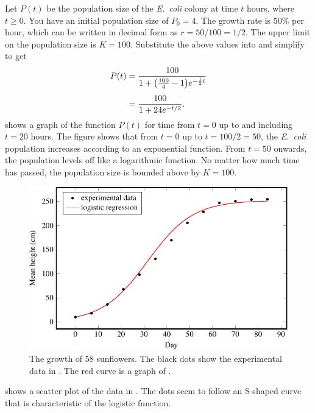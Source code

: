 \documentclass[a4paper,oneside,12pt]{article}
\begin{document}
\begin{problem}
{\begin{solution}
Let $P(t)$ be the population size of the \emph{E.~coli} colony at time
$t$ hours, where $t \geq 0$.  You have an initial population size of
$P_0 = 4$.  The growth rate is $50\%$ per hour, which can be written
in decimal form as $r = 50 / 100 = 1 / 2$.  The upper limit on the
population size is $K = 100$.  Substitute the above values into
 and simplify to get
\begin{align*}
P(t)
&=
\frac{
  100
}{
  1 + \parenthesis*{\frac{100}{4} - 1} e^{-\frac{1}{2}t}
} \\[4pt]
&=
\frac{
  100
}{
  1 + 24 e^{-t/2}
}.
\end{align*}
 shows a graph of the
function $P(t)$ for time from $t = 0$ up to and including $t = 20$
hours.  The figure shows that from $t = 0$ up to $t = 100/2 = 50$, the
\emph{E.~coli} population increases according to an exponential
function.  From $t = 50$ onwards, the population levels off like a
logarithmic function.  No matter how much time has passed, the
population size is bounded above by $K = 100$.

\begin{figure}[!htbp]
\centering
\includegraphics[scale=1.1]{image/12/sunflower.pdf}
\caption{%
  The growth of $58$ sunflowers.  The black dots show the experimental
  data in .  The red curve is a graph
  of
  .
}
\label{fig:logarithm:sunflower}
\end{figure}

 shows a scatter plot of the data in
.  The dots seem to follow an S-shaped
curve that is characteristic of the logistic function.


\end{solution}}
\end{problem}
\end{document}
